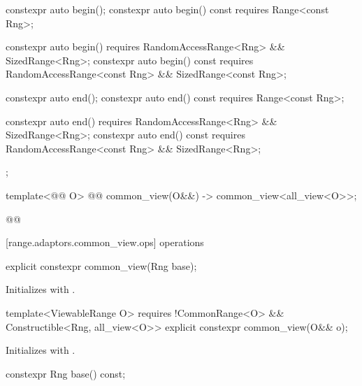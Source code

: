 {\begin{codeblock}
{{    constexpr auto begin();
    constexpr auto begin() const requires Range<const Rng>;

    constexpr auto begin()
      requires RandomAccessRange<Rng> && SizedRange<Rng>;
    constexpr auto begin() const
      requires RandomAccessRange<const Rng> && SizedRange<const Rng>;

    constexpr auto end();
    constexpr auto end() const requires Range<const Rng>;

    constexpr auto end()
      requires RandomAccessRange<Rng> && SizedRange<Rng>;
    constexpr auto end() const
      requires RandomAccessRange<const Rng> && SizedRange<Rng>;
  };

  template<@@ O>
    @@
  common_view(O&&) -> common_view<all_view<O>>;
}@\oldtxt{\}}@
\end{codeblock}

[range.adaptors.common_view.ops]{ operations}

%
\begin{itemdecl}
explicit constexpr common_view(Rng base);
\end{itemdecl}

\begin{itemdescr}
\pnum
\effects Initializes  with .
\end{itemdescr}

%
\begin{itemdecl}
template<ViewableRange O>
  requires !CommonRange<O> && Constructible<Rng, all_view<O>>
explicit constexpr common_view(O&& o);
\end{itemdecl}

\begin{itemdescr}
\pnum
\effects Initializes  with .
\end{itemdescr}

%
\begin{itemdecl}
constexpr Rng base() const;
\end{itemdecl}

\begin{itemdescr}
\pnum
\oldtxt{\returns}  
\end{itemdescr}

}
